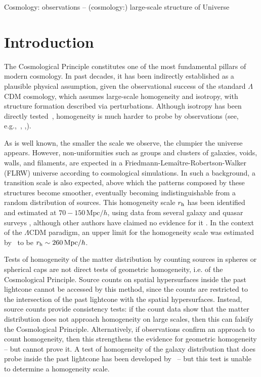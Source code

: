 \documentclass[useAMS,usenatbib]{mn2e}
\begin{document}
\begin{keywords}
Cosmology: observations -- (cosmology:) large-scale structure of Universe
\end{keywords}


\section{Introduction}

The Cosmological Principle constitutes one of the most fundamental pillars of modern cosmology. In  past decades, it has been indirectly established as a plausible physical assumption, given the observational success of the standard $\Lambda$CDM cosmology, which assumes large-scale homogeneity and isotropy, with structure formation described via perturbations. Although isotropy has been directly tested~\citep{blake02, bernui14, tiwari16, bengaly16, schwarz16, bengaly17, bernal17, javanmardi17}, homogeneity is much harder to probe by observations (see, e.g.,~\citealt{clarksonmaartens10}, \citealt{maartens11},\citealt{clarkson12}). 

As is well known, the smaller the scale we observe, the clumpier the universe appears. However, non-uniformities such as groups and clusters of galaxies, voids, walls, and filaments, are expected in a Friedmann-Lema\^itre-Robertson-Walker (FLRW) universe according to cosmological simulations. In such a background, a transition scale is also expected, above which the patterns composed by these structures become smoother, eventually becoming indistinguishable from a random distribution of sources. This homogeneity scale $r_{\rm h}$ has been identified and estimated at $70 - 150 \, \mathrm{Mpc}/h$, using data from several galaxy and quasar surveys \citep{hogg05, scrimgeour12, nadathur13, alonso15, pandey15, laurent16, sarkar16, ntelis17}, although other authors have claimed no evidence for it \citep{syloslabini98, syloslabini11, park17}. In the context of the $\Lambda$CDM paradigm, an upper limit for the homogeneity scale was estimated by~\cite{yadav10} to be $r_{\rm h} \sim 260 \, \mathrm{Mpc}/h$. 

Tests of homogeneity of the matter distribution by counting sources in spheres or spherical caps are not direct tests of geometric homogeneity, i.e. of the Cosmological Principle. Source counts on spatial hypersurfaces inside the past lightcone cannot be accessed by this method, since the counts are restricted to the intersection of the past lightcone with the spatial hypersurfaces. Instead, source counts provide consistency tests: if the count data show that the matter distribution does not approach homogeneity on large scales, then this can falsify the Cosmological Principle. Alternatively, if observations confirm an approach to count homogeneity, then this strengthens the evidence for geometric homogeneity -- but cannot prove it. A test of homogeneity of the galaxy distribution that does probe inside the past lightcone has been developed by~\cite{heavens11, hoyle12} -- but this test is unable to determine a homogeneity scale. 
\end{document}
